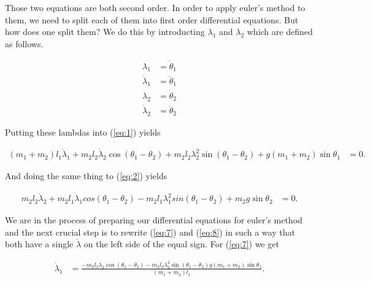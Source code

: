 \documentclass[paper=a4, fontsize=11pt]{scrartcl} %
\numberwithin{equation}{section} %
\numberwithin{figure}{section} %
\numberwithin{table}{section} %
\begin{document}
Those two equations are both second order. In order to apply euler's method to them, we need to split each of them into first order differential equations.
But how does one split them? We do this by introducting $\lambda_1$ and $\lambda_2$ which are defined as follows.

\begin{align} 
  \lambda_1 &= \dot{\theta}_1 \label{eq:3} \\
  \dot{\lambda}_1 &= \ddot{\theta}_1 \label{eq:4}
  \\
  \lambda_2 &= \dot{\theta}_2 \label{eq:5} \\
  \dot{\lambda}_2 &= \ddot{\theta}_2 \label{eq:6}
\end{align}


Putting these lambdas into (\ref{eq:1}) yields

\begin{align} \label{eq:7}
  (m_1 + m_2) l_1 \dot{\lambda}_1 + m_2 l_2 \dot{\lambda}_2 \cos(\theta_1 - \theta_2)
  + m_2 l_2 \lambda^2_2 \sin(\theta_1 - \theta_2) + g (m_1 + m_2) \sin \theta_1 &= 0.
\end{align}

And doing the same thing to (\ref{eq:2}) yields

\begin{align} \label{eq:8}
  m_2 l_2 \dot{\lambda}_2 + m_2 l_1 \dot{\lambda}_1 cos(\theta_1 - \theta_2)
  - m_2 l_1 \lambda^2_1 sin(\theta_1 - \theta_2) + m_2 g \sin \theta_2 &= 0.
\end{align}

We are in the process of preparing our differential equations for euler's method and the next crucial step is to rewrite (\ref{eq:7}) and (\ref{eq:8})
in such a way that both have a single $\dot{\lambda}$ on the left side of the equal sign. For (\ref{eq:7}) we get

\begin{align} \label{eq:9}
   \dot{\lambda}_1 &= \frac{- m_2 l_2 \dot{\lambda}_2 \cos(\theta_1 - \theta_2) - m_2 l_2 \lambda^2_2 \sin(\theta_1 - \theta_2) g (m_1 + m_2) \sin \theta_1}{(m_1 + m_2) l_1}.
\end{align}
\end{document}
